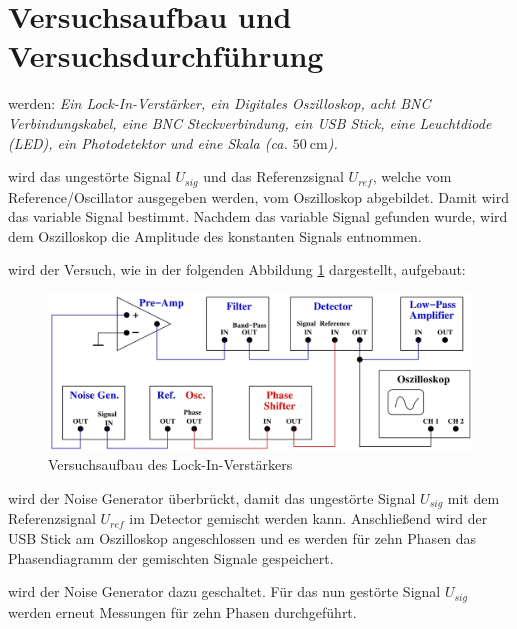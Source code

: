 
\section{Versuchsaufbau und Versuchsdurchführung}\justifying

\justifying werden: \textit{Ein Lock-In-Verstärker, ein Digitales Oszilloskop, acht BNC Verbindungskabel, eine BNC 
Steckverbindung, ein USB Stick, eine Leuchtdiode (LED), ein Photodetektor und eine Skala (ca. $\SI{50}{\centi\meter}$).}

\justifying wird das ungestörte Signal $U_{sig}$ und das Referenzsignal $U_{ref}$, welche vom Reference/Oscillator ausgegeben werden, 
vom Oszilloskop abgebildet. Damit wird das variable Signal bestimmt. Nachdem das variable Signal gefunden wurde, wird dem Oszilloskop die Amplitude 
des konstanten Signals entnommen. 

\justifying wird der Versuch, wie in der folgenden Abbildung \ref{fig:1} dargestellt, aufgebaut: 

\begin{figure}[H]
    \centering
    \includegraphics[width=\linewidth]{./images/lock-in.jpg}
    \caption{Versuchsaufbau des Lock-In-Verstärkers \cite{V303}}
    \label{fig:1}
\end{figure}

\justifying wird der Noise Generator überbrückt, damit das ungestörte Signal $U_{sig}$ mit dem Referenzsignal $U_{ref}$
im Detector gemischt werden kann. Anschließend wird der USB Stick am Oszilloskop angeschlossen und es werden für zehn Phasen das Phasendiagramm 
der gemischten Signale gespeichert.

\justifying wird der Noise Generator dazu geschaltet. Für das nun gestörte Signal $U_{sig}$ werden erneut Messungen für zehn Phasen 
durchgeführt. 

